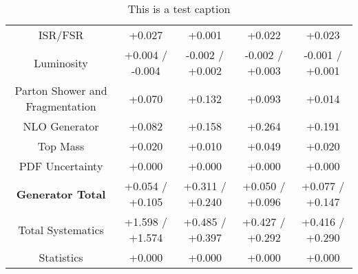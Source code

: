\begin{table}[htbp]
\begin{center}
\begin{tabular}{|c|c|c|c|c|}
ISR/FSR                               &+0.027              & +0.001              & +0.022              & +0.023             \\
Luminosity                            &+0.004   / -0.004   & -0.002   / +0.002   & -0.002   / +0.003   & -0.001   / +0.001  \\
Parton Shower and Fragmentation       &+0.070              & +0.132              & +0.093              & +0.014             \\
NLO Generator                         &+0.082              & +0.158              & +0.264              & +0.191             \\
Top Mass                              &+0.020              & +0.010              & +0.049              & +0.020             \\
PDF Uncertainty                       &+0.000              & +0.000              & +0.000              & +0.000             \\
\hline
\textbf{Generator Total}              &+0.054   / +0.105   & +0.311   / +0.240   & +0.050   / +0.096   & +0.077   / +0.147  \\
\hline
\hline
Total Systematics                     &+1.598   / +1.574   & +0.485   / +0.397   & +0.427   / +0.292   & +0.416   / +0.290  \\
Statistics                            &+0.000              & +0.000              & +0.000              & +0.000             \\
\hline
  \end{tabular}
  \end{center} 
  \label{tab:fsm_nominal_coscos_op_high}
  \caption{This is a test caption}
\end{table}
 
 

